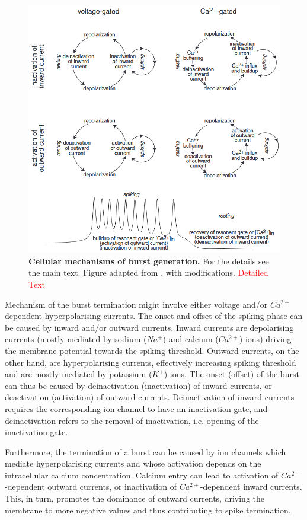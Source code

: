 \documentclass[../main.tex]{subfiles}
\begin{document}
\begin{figure}[!t]
    \centering
    \includegraphics[width=0.85\linewidth]{../img/modelling_r5/examples/bursting_ionic_basis.png}
    \caption[Cellular mechanisms of burst generation]{
        \textbf{Cellular mechanisms of burst generation.}
        For the details see the main text.
        Figure adapted from \cite{izhikevichDynamicalSystemsNeuroscience2006}, with modifications.
        \textcolor{red}{Detailed Text}
    }
    \label{fig:ionic_basis_for_slow_fast_bursting}
\end{figure}

Mechanism of the burst termination might involve either voltage and/or $Ca^{2+}$ dependent hyperpolarising currents.
The onset and offset of the spiking phase can be caused by inward and/or outward currents. Inward currents are depolarising currents (mostly mediated by sodium ($Na^+$) and calcium ($Ca^{2+}$) ions) driving the membrane potential towards the spiking threshold. Outward currents, on the other hand, are hyperpolarising currents, effectively increasing spiking threshold and are mostly mediated by potassium ($K^+$) ions.
The onset (offset) of the burst can thus be caused by deinactivation (inactivation) of inward currents, or deactivation (activation) of outward currents. Deinactivation of inward currents requires the corresponding ion channel to have an inactivation gate, and deinactivation refers to the removal of inactivation, i.e. opening of the inactivation gate.

Furthermore, the termination of a burst can be caused by ion channels which mediate hyperpolarising currents and whose activation depends on the intracellular calcium concentration. Calcium entry can lead to activation of $Ca^{2+}$-dependent outward currents, or inactivation of $Ca^{2+}$-dependent inward currents. This, in turn, promotes the dominance of outward currents, driving the membrane to more negative values and thus contributing to spike termination.
\end{document}
